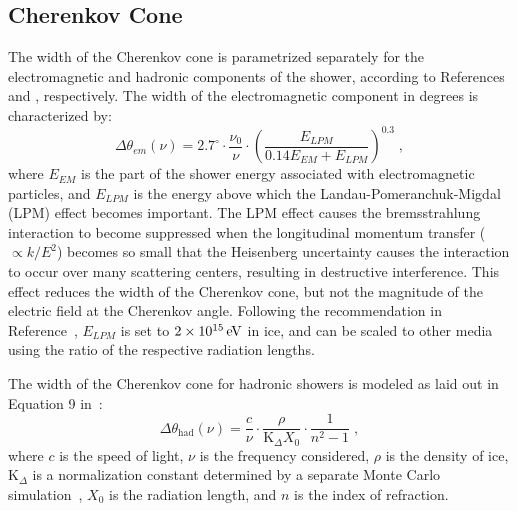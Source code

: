 
\subsection{Cherenkov Cone}
\label{subsec:cherenkov_width}
The width of the Cherenkov cone is parametrized separately for the electromagnetic and hadronic components of the shower, according to References \cite{JaimeAskarian2000} and \cite{jaime05}, respectively.
The width of the electromagnetic
component in degrees is characterized by:
\begin{equation}
\label{eq:deltheta_em}
\Delta\theta_{em}(\nu)=2.7^{\circ} \cdot \frac{\nu_0}{\nu}\cdot \left(
  \frac{E_{LPM}}{ 0.14 E_{EM}+E_{LPM}} \right)^{0.3} \;,
\end{equation}
where 
$E_{EM}$ is the part of the shower energy associated with electromagnetic particles, and 
$E_{LPM}$ is the energy above which the Landau-Pomeranchuk-Migdal
(LPM) effect becomes important.  
The LPM effect causes
the bremsstrahlung interaction to become suppressed when the longitudinal
momentum transfer ($\propto k/E^2$) becomes so small 
that the Heisenberg uncertainty
causes the interaction to occur over many
scattering centers, resulting in destructive interference.  
This effect reduces the width of the Cherenkov cone, but not the magnitude of the electric field at the Cherenkov angle.
Following the recommendation in Reference~\cite{JaimeAskarian2000}, 
$E_{LPM}$ is set to $2\times10^{15}\mathrm{\,e\kern -0.1em V}$ in ice,
and can be scaled to other media using the ratio of the respective radiation lengths.


The width of the Cherenkov cone for hadronic showers is modeled as laid out in Equation 9
in~\cite{jaime05}:
\begin{equation}
\Delta \theta_{\mathrm{had}} (\nu) =\frac{c}{\nu} \cdot
	\frac{\rho}{\mathrm{K}_{\Delta} X_0} \cdot
	\frac{1}{n^2-1} \;,
\end{equation}
\noindent where
$c$ is the speed of light,
$\nu$ is the frequency considered, 
$\rho$ is the density of ice,
$\mathrm{K}_{\Delta}$ is a normalization constant determined by a
separate Monte Carlo simulation~\cite{jaime05},
$X_0$ is the radiation length, and
$n$ is the index of refraction.

